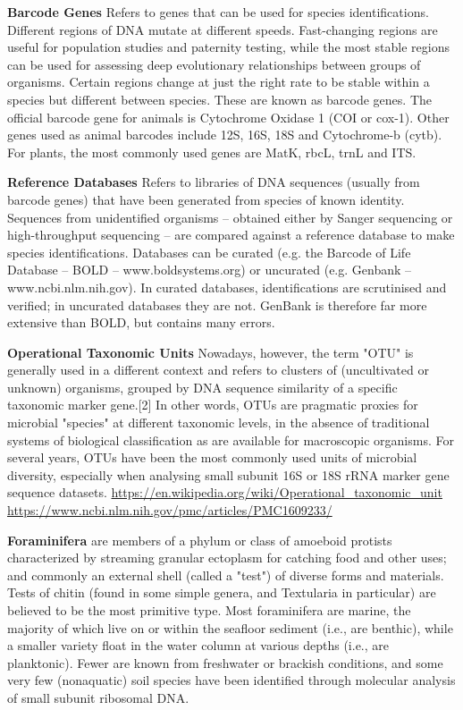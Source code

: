 \textbf{Barcode Genes} Refers to genes that can be used for species identifications. Different regions of DNA mutate at different speeds. Fast-changing regions are useful for population studies and paternity testing, while the most stable regions can be used for assessing deep evolutionary relationships between groups of organisms. Certain regions change at just the right rate to be stable within a species but different between species. These are known as barcode genes. The official barcode gene for animals is Cytochrome Oxidase 1 (COI or cox-1). Other genes used as animal barcodes include 12S, 16S, 18S and Cytochrome-b (cytb). For plants, the most commonly used genes are MatK, rbcL, trnL and ITS.

 

\textbf{Reference Databases}
Refers to libraries of DNA sequences (usually from barcode genes) that have been generated from species of known identity. Sequences from unidentified organisms – obtained either by Sanger sequencing or high-throughput sequencing – are compared against a reference database to make species identifications. Databases can be curated (e.g. the Barcode of Life Database – BOLD – www.boldsystems.org) or uncurated (e.g. Genbank – www.ncbi.nlm.nih.gov). In curated databases, identifications are scrutinised and verified; in uncurated databases they are not. GenBank is therefore far more extensive than BOLD, but contains many errors.


\textbf{Operational Taxonomic Units }
Nowadays, however, the term "OTU" is generally used in a different context and refers to clusters of (uncultivated or unknown) organisms, grouped by DNA sequence similarity of a specific taxonomic marker gene.[2] In other words, OTUs are pragmatic proxies for microbial "species" at different taxonomic levels, in the absence of traditional systems of biological classification as are available for macroscopic organisms. For several years, OTUs have been the most commonly used units of microbial diversity, especially when analysing small subunit 16S or 18S rRNA marker gene sequence datasets. \url{https://en.wikipedia.org/wiki/Operational_taxonomic_unit}
\url{https://www.ncbi.nlm.nih.gov/pmc/articles/PMC1609233/}



\textbf{Foraminifera}  are members of a phylum or class of amoeboid protists characterized by streaming granular ectoplasm for catching food and other uses; and commonly an external shell (called a "test") of diverse forms and materials. Tests of chitin (found in some simple genera, and Textularia in particular) are believed to be the most primitive type. Most foraminifera are marine, the majority of which live on or within the seafloor sediment (i.e., are benthic), while a smaller variety float in the water column at various depths (i.e., are planktonic). Fewer are known from freshwater or brackish conditions, and some very few (nonaquatic) soil species have been identified through molecular analysis of small subunit ribosomal DNA.

